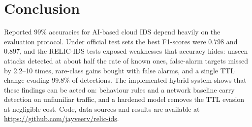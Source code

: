 \documentclass[conference]{IEEEtran}
\begin{document}
\section{Conclusion}
Reported 99\% accuracies for AI-based cloud IDS depend heavily on the evaluation protocol. Under official test sets the best F1-scores were 0.798 and 0.897, and the RELIC-IDS tests exposed weaknesses that accuracy hides: unseen attacks detected at about half the rate of known ones, false-alarm targets missed by 2.2--10 times, rare-class gains bought with false alarms, and a single TTL change evading 99.8\% of detections. The implemented hybrid system shows that these findings can be acted on: behaviour rules and a network baseline carry detection on unfamiliar traffic, and a hardened model removes the TTL evasion at negligible cost. Code, data sources and results are available at \url{https://github.com/jayveerv/relic-ids}.
\end{document}

